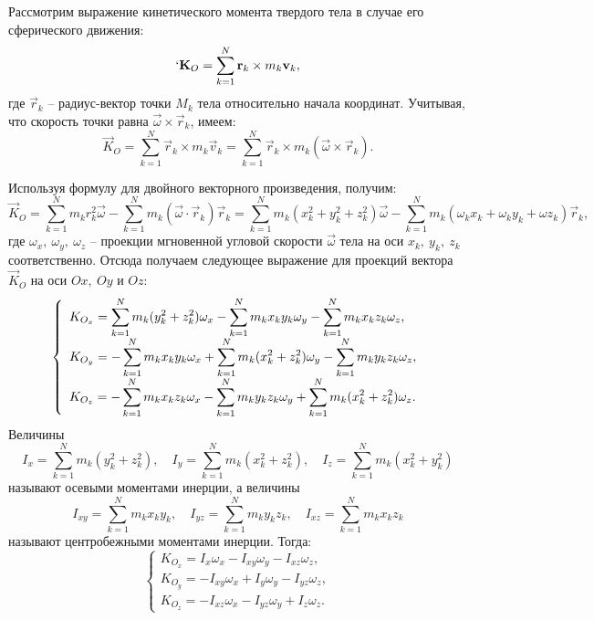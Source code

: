 
Рассмотрим выражение кинетического момента твердого тела в случае его
сферического движения:
\[
`\vec{K}_O = \sum_{k=1}^N\vec{r}_k\times m_k\vec{v}_k,
\]
где \( \vec{r}_k \) -- радиус-вектор точки \( M_k \) тела относительно начала
координат. Учитывая, что скорость точки равна \( \vec{\omega}\times\vec{r}_k \),
имеем:
\[
    \vec{K}_O = \sum_{k=1}^N\vec{r}_k\times m_k\vec{v}_k =
    \sum_{k=1}^N \vec{r}_k\times m_k(\vec{\omega}\times\vec{r}_k).
\]

Используя формулу для двойного векторного произведения, получим:
\[
    \vec{K}_O = \sum_{k=1}^N m_k r_k^2\vec{\omega} - \sum_{k=1}^N m_k
    (\vec{\omega}\cdot\vec{r}_k)\vec{r}_k = \sum_{k=1}^N m_k(x_k^2 + y_k^2 +
    z_k^2)\vec{\omega} - \sum_{k=1}^N m_k (\omega_k x_k + \omega_k y_k + \omega
    z_k)\vec{r}_k,
\]
где \( \omega_x,\ \omega_y,\ \omega_z \) -- проекции мгновенной угловой скорости
\( \vec{\omega} \) тела на оси \( x_k,\ y_k,\ z_k \) соответственно. Отсюда
получаем следующее выражение для проекций вектора \( \vec{K}_O \) на оси
\( Ox,\ Oy \) и \( Oz \):
\[
    \left\{ \begin{array}{l}
        \ds K_{O_x} = \sum_{k=1}^N m_k(y_k^2 + z_k^2)\omega_x - \sum_{k=1}^N m_k
        x_k y_k \omega_y - \sum_{k=1}^N m_k x_k z_k \omega_z, \\[.4em]
        \ds K_{O_y} = -\sum_{k=1}^N m_k x_k y_k \omega_x + \sum_{k=1}^N m_k
        (x_k^2 + z_k^2)\omega_y  - \sum_{k=1}^N m_k y_k z_k \omega_z, \\[.4em]
        \ds K_{O_z} = -\sum_{k=1}^N m_k x_k z_k \omega_x - \sum_{k=1}^N m_k y_k
        z_k \omega_y + \sum_{k=1}^N m_k (x_k^2 + z_k^2)\omega_z.
    \end{array} \right.
\]
Величины
\[
    I_x = \sum_{k=1}^N m_k(y_k^2 + z_k^2), \quad I_y = \sum_{k=1}^N m_k(x_k^2 +
    z_k^2), \quad I_z = \sum_{k=1}^N m_k(x_k^2 + y_k^2)
\]
называют осевыми моментами инерции, а величины
\[
    I_{xy} = \sum_{k=1}^N m_k x_k y_k, \quad I_{yz} = \sum_{k=1}^N m_k y_k z_k,
    \quad I_{xz} = \sum_{k=1}^N m_k x_k z_k
\]
называют центробежными моментами инерции. Тогда:
\[
    \left\{ \begin{array}{l}
        K_{O_x} = I_x\omega_x - I_{xy}\omega_y - I_{xz}\omega_z, \\
        K_{O_y} = -I_{xy}\omega_x + I_y\omega_y  - I_{yz}\omega_z, \\
        K_{O_z} = -I_{xz}\omega_x - I_{yz}\omega_y + I_z\omega_z.
    \end{array} \right.
\]

